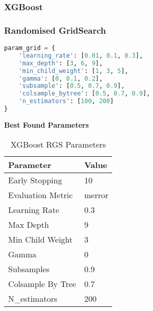  \newpage

\subsubsection{XGBoost}
\label{sec:xgboost}


\subsubsection*{Randomised GridSearch}

\begin{lstlisting}[language=Python, caption={Parameter Grid For XGBoost}]
param_grid = {
    'learning_rate': [0.01, 0.1, 0.3],
    'max_depth': [3, 6, 9],
    'min_child_weight': [1, 3, 5],
    'gamma': [0, 0.1, 0.2],
    'subsample': [0.5, 0.7, 0.9],
    'colsample_bytree': [0.5, 0.7, 0.9],
    'n_estimators': [100, 200]
}
\end{lstlisting}

\textbf{Best Found Parameters}
\medskip

\begin{table}[h]
\captionsetup{justification=centering} 
\centering
\caption{XGBoost RGS Parameters}
\begin{tabular}{ll}
\hline
\textbf{Parameter} & \textbf{Value} \\ \hline
Early Stopping & 10 \\
Evaluation Metric & merror \\
Learning Rate & 0.3 \\
Max Depth & 9 \\
Min Child Weight & 3 \\
Gamma & 0 \\
Subsamples & 0.9 \\
Colsample By Tree & 0.7 \\
N\_estimators & 200 \\ \hline
\end{tabular}
\label{tab:xg_rgs_parameters}
\end{table}

